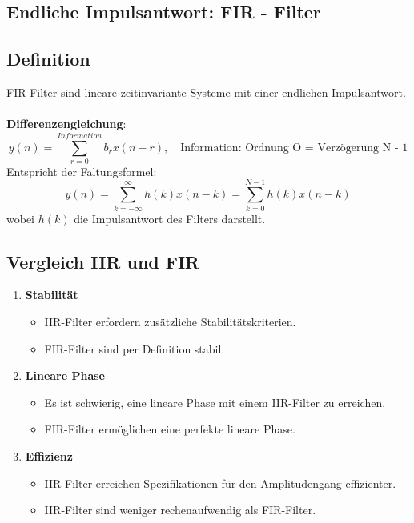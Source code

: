 \documentclass[12pt]{article}
\begin{document}
   \newpage
   \subsection{Endliche Impulsantwort: FIR - Filter}  %
      \subsection*{Definition}
         FIR-Filter sind lineare zeitinvariante Systeme mit einer endlichen Impulsantwort.\\ 
         \\
         \textbf{Differenzengleichung}:
         \[
            y(n) = \sum_{r=0}^{Information} b_r x(n-r), \quad \text{Information: Ordnung O = Verzögerung N - 1} %
         \]
         Entspricht der Faltungsformel:
         \[
            y(n) = \sum_{k=-\infty}^{\infty} h(k)x(n-k) = \sum_{k=0}^{N-1} h(k)x(n-k)
         \]
         wobei \(h(k)\) die Impulsantwort des Filters darstellt.

   \subsection*{Vergleich IIR und FIR}
      \begin{enumerate}
         \item \textbf{Stabilität}
         \begin{itemize}
            \item IIR-Filter erfordern zusätzliche Stabilitätskriterien.
            \item FIR-Filter sind per Definition stabil.
         \end{itemize}
         \item \textbf{Lineare Phase}
         \begin{itemize}
            \item Es ist schwierig, eine lineare Phase mit einem IIR-Filter zu erreichen.
            \item FIR-Filter ermöglichen eine perfekte lineare Phase.
         \end{itemize}
         \item \textbf{Effizienz}
         \begin{itemize}
            \item IIR-Filter erreichen Spezifikationen für den Amplitudengang effizienter.
            \item IIR-Filter sind weniger rechenaufwendig als FIR-Filter.
         \end{itemize}
      \end{enumerate}
\end{document}

